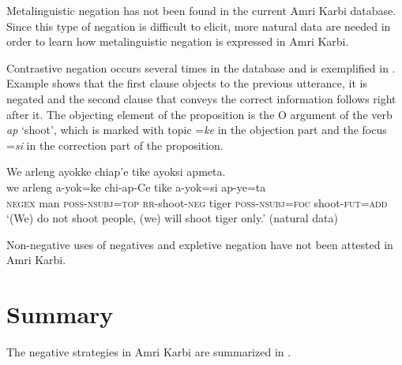 \documentclass[output=paper,colorlinks,citecolor=brown]{langscibook}
\begin{document}
Metalinguistic negation has not been found in the current Amri Karbi database. Since this type of negation is difficult to elicit, more natural data are needed in order to learn how metalinguistic negation is expressed in Amri Karbi. 

Contrastive negation occurs several times in the database and is exemplified in . Example  shows that the first clause objects to the previous utterance, it is negated and the second clause that conveys the correct information follows right after it. The objecting element of the proposition is the O argument of the verb \textit{ap} ‘shoot’, which is marked with topic =\textit{ke} in the objection part and the focus =\textit{si} in the correction part of the proposition. 

{\ea\label{ex:amr:60}We arleng ayokke chiap’e tike ayoksi apmeta. \\
    \gll we arleng a-yok=ke chi-ap-Ce tike a-yok=si ap-ye=ta \\
          \textsc{negex} man \textsc{poss}{}-\textsc{nsubj}=\textsc{top} \textsc{rr}{}-shoot-\textsc{neg} tiger \textsc{poss}{}-\textsc{nsubj}=\textsc{foc} shoot-\textsc{fut}=\textsc{add}\\
    \glt  ‘(We) do not shoot people, (we) will shoot tiger only.’ (natural data)
\z}

Non-negative uses of negatives and expletive negation have not been attested in Amri Karbi.

\section{Summary} \label{sec:amr:5}

The negative strategies in Amri Karbi are summarized in .
\end{document}
